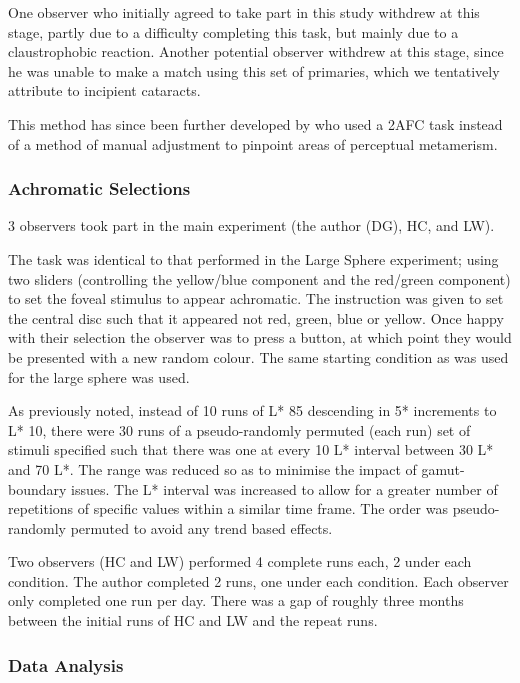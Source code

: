 One observer who initially agreed to take part in this study withdrew at this stage, partly due to a difficulty completing this task, but mainly due to a claustrophobic reaction. Another potential observer withdrew at this stage, since he was unable to make a match using this set of primaries, which we tentatively attribute to incipient cataracts.

This method has since been further developed by \citet{allen_form_2019} who used a 2AFC task instead of a method of manual adjustment to pinpoint areas of perceptual metamerism.

\subsubsection{Achromatic Selections}

3 observers took part in the main experiment (the author (DG), HC, and LW). 

The task was identical to that performed in the Large Sphere experiment; using two sliders (controlling the yellow/blue component and the red/green component) to set the foveal stimulus to appear achromatic. The instruction was given to set the central disc such that it appeared not red, green, blue or yellow. Once happy with their selection the observer was to press a button, at which point they would be presented with a new random colour. The same starting condition as was used for the large sphere was used.

As previously noted, instead of 10 runs of L* 85 descending in 5* increments to L* 10, there were 30 runs of a pseudo-randomly permuted (each run) set of stimuli specified such that there was one at every 10 L* interval between 30 L* and 70 L*. The range was reduced so as to minimise the impact of gamut-boundary issues. The L* interval was increased to allow for a greater number of repetitions of specific values within a similar time frame. The order was pseudo-randomly permuted to avoid any trend based effects.

Two observers (HC and LW) performed 4 complete runs each, 2 under each condition. The author completed 2 runs, one under each condition. Each observer only completed one run per day. There was a gap of roughly three months between the initial runs of HC and LW and the repeat runs.

\subsubsection{Data Analysis}

